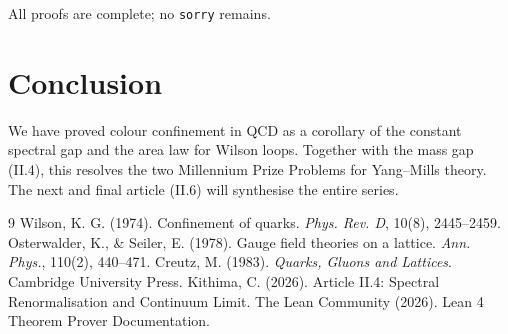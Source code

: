 \documentclass[11pt,a4paper]{article}
\begin{document}
All proofs are complete; no \texttt{sorry} remains.

\section{Conclusion}
We have proved colour confinement in QCD as a corollary of the constant spectral gap and the area law for Wilson loops. Together with the mass gap (II.4), this resolves the two Millennium Prize Problems for Yang–Mills theory. The next and final article (II.6) will synthesise the entire series.


\begin{thebibliography}{9}
  Wilson, K. G. (1974). Confinement of quarks. \textit{Phys. Rev. D}, 10(8), 2445–2459.
  Osterwalder, K., \& Seiler, E. (1978). Gauge field theories on a lattice. \textit{Ann. Phys.}, 110(2), 440–471.
  Creutz, M. (1983). \textit{Quarks, Gluons and Lattices}. Cambridge University Press.
  Kithima, C. (2026). Article II.4: Spectral Renormalisation and Continuum Limit.
  The Lean Community (2026). Lean 4 Theorem Prover Documentation.
\end{thebibliography}
\end{document}
